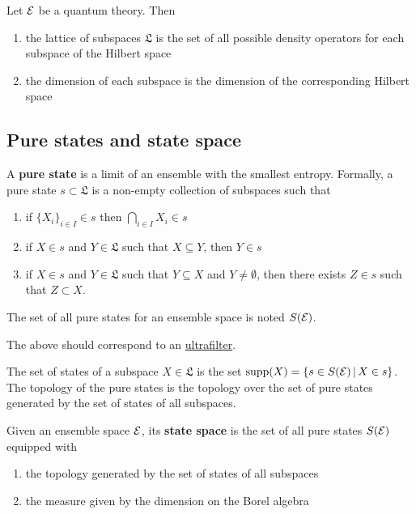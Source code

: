 \begin{conj}
	Let $\mathcal{E}$ be a quantum theory. Then
	\begin{enumerate}
		\item the lattice of subspaces $\mathfrak{L}$ is the set of all possible density operators for each subspace of the Hilbert space
		\item the dimension of each subspace is the dimension of the corresponding Hilbert space
	\end{enumerate}
\end{conj}

\subsection{Pure states and state space}

\begin{defn}
	A \textbf{pure state} is a limit of an ensemble with the smallest entropy. Formally, a pure state $s \subset \mathfrak{L}$ is a non-empty collection of subspaces such that
	\begin{enumerate}
		\item if $\{X_i\}_{i \in I} \in s$ then $\bigcap_{i \in I} X_i \in s$
		\item if $X \in s$ and $Y \in \mathfrak{L}$ such that $X \subseteq Y$, then $Y \in s$
		\item if $X \in s$ and $Y \in \mathfrak{L}$ such that $Y \subseteq X$ and $Y \neq \emptyset$, then there exists $Z \in s$ such that $Z \subset X$.
	\end{enumerate}
	The set of all pure states for an ensemble space is noted $S(\mathcal{E})$.
\end{defn}

\begin{remark}
	The above should correspond to an \href{https://en.wikipedia.org/wiki/Ultrafilter}{ultrafilter}.
\end{remark}

\begin{defn}
	The set of states of a subspace $X \in \mathfrak{L}$ is the set $\mathrm{supp}(X) = \{ s \in S(\mathcal{E}) \, | \, X \in s \}$. The topology of the pure states is the topology over the set of pure states generated by the set of states of all subspaces.
\end{defn}

\begin{defn}
	Given an ensemble space $\mathcal{E}$, its \textbf{state space} is the set of all pure states $S(\mathcal{E})$ equipped with
	\begin{enumerate}
		\item the topology generated by the set of states of all subspaces
		\item the measure given by the dimension on the Borel algebra
	\end{enumerate}
\end{defn}

